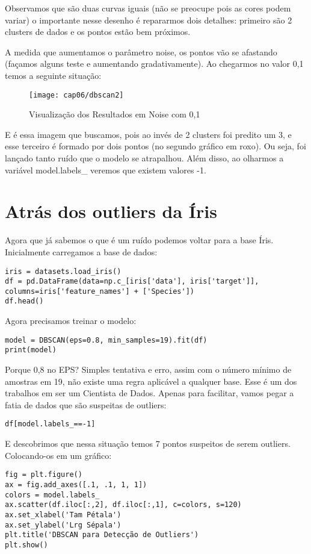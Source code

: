 Observamos que são duas curvas iguais (não se preocupe pois as cores podem variar) o importante nesse desenho é repararmos dois detalhes: primeiro são 2 clusters de dados e os pontos estão bem próximos.

A medida que aumentamos o parâmetro noise, os pontos vão se afastando (façamos alguns teste e aumentando gradativamente). Ao chegarmos no valor 0,1 temos a seguinte situação:
\begin{figure}[H]
	\centering
	\texttt{[image: cap06/dbscan2]}
	\caption{Visualização dos Resultados em Noise com 0,1}
\end{figure}

E é essa imagem que buscamos, pois ao invés de 2 clusters foi predito um 3, e esse terceiro é formado por dois pontos (no segundo gráfico em roxo). Ou seja, foi lançado tanto ruído que o modelo se atrapalhou. Além disso, ao olharmos a variável model.labels\_ veremos que existem valores -1.

\section{Atrás dos outliers da Íris}
Agora que já sabemos o que é um ruído podemos voltar para a base Íris. Inicialmente carregamos a base de dados:
\begin{lstlisting}[]
iris = datasets.load_iris()
df = pd.DataFrame(data=np.c_[iris['data'], iris['target']], 
columns=iris['feature_names'] + ['Species'])
df.head()
\end{lstlisting}

Agora precisamos treinar o modelo:
\begin{lstlisting}[]
model = DBSCAN(eps=0.8, min_samples=19).fit(df)
print(model)
\end{lstlisting}

Porque 0,8 no EPS? Simples tentativa e erro, assim com o número mínimo de amostras em 19, não existe uma regra aplicável a qualquer base. Esse é um dos trabalhos em ser um Cientista de Dados. Apenas para facilitar, vamos pegar a fatia de dados que são suspeitas de outliers:
\begin{lstlisting}[]
df[model.labels_==-1]
\end{lstlisting}

E descobrimos que nessa situação temos 7 pontos suspeitos de serem outliers. Colocando-os em um gráfico:
\begin{lstlisting}[]
fig = plt.figure()
ax = fig.add_axes([.1, .1, 1, 1])
colors = model.labels_
ax.scatter(df.iloc[:,2], df.iloc[:,1], c=colors, s=120)
ax.set_xlabel('Tam Pétala')
ax.set_ylabel('Lrg Sépala')
plt.title('DBSCAN para Detecção de Outliers')
plt.show()
\end{lstlisting}

